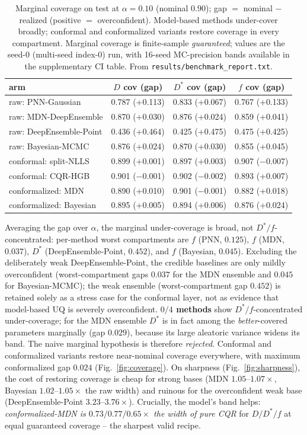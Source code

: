\documentclass[11pt]{article}
\newcommand{\Dstar}{D^{*}}
\begin{document}
\begin{table}[t]
\centering
\caption{Marginal coverage on test at $\alpha=0.10$ (nominal $0.90$); gap $=$
nominal $-$ realized (positive $=$ overconfident). Model-based methods under-cover
broadly; conformal and conformalized variants restore coverage in every
compartment. Marginal coverage is finite-sample \emph{guaranteed}; values are the
seed-0 (multi-seed index-0) run, with 16-seed MC-precision bands available in the
supplementary CI table. From \texttt{results/benchmark\_report.txt}.}
\label{tab:marginal}
\small
\begin{tabular}{lccc}
\toprule
arm & $D$ cov (gap) & $\Dstar$ cov (gap) & $f$ cov (gap) \\
\midrule
raw: PNN-Gaussian        & 0.787 (+0.113) & 0.833 (+0.067) & 0.767 (+0.133) \\
raw: MDN-DeepEnsemble    & 0.870 (+0.030) & 0.876 (+0.024) & 0.859 (+0.041) \\
raw: DeepEnsemble-Point  & 0.436 (+0.464) & 0.425 (+0.475) & 0.475 (+0.425) \\
raw: Bayesian-MCMC       & 0.876 (+0.024) & 0.870 (+0.030) & 0.855 (+0.045) \\
\midrule
conformal: split-NLLS    & 0.899 (+0.001) & 0.897 (+0.003) & 0.907 ($-$0.007) \\
conformal: CQR-HGB       & 0.901 ($-$0.001) & 0.902 ($-$0.002) & 0.893 (+0.007) \\
conformalized: MDN       & 0.890 (+0.010) & 0.901 ($-$0.001) & 0.882 (+0.018) \\
conformalized: Bayesian  & 0.895 (+0.005) & 0.894 (+0.006) & 0.876 (+0.024) \\
\bottomrule
\end{tabular}
\end{table}

Averaging the gap over $\alpha$, the marginal under-coverage is broad, not
$\Dstar/f$-concentrated: per-method worst compartments are $f$ (PNN, $0.125$), $f$
(MDN, $0.037$), $\Dstar$ (DeepEnsemble-Point, $0.452$), and $f$ (Bayesian, $0.045$).
Excluding the deliberately weak DeepEnsemble-Point, the credible baselines are only
mildly overconfident (worst-compartment gaps $0.037$ for the MDN ensemble and
$0.045$ for Bayesian-MCMC); the weak ensemble (worst-compartment gap $0.452$) is
retained solely as a stress case for the conformal layer, not as evidence that
model-based UQ is severely overconfident.
\textbf{$0/4$ methods} show $\Dstar/f$-concentrated under-coverage; for the MDN
ensemble $\Dstar$ is in fact among the \emph{better}-covered parameters
marginally (gap $0.029$), because its large aleatoric variance widens its band. The naive
marginal hypothesis is therefore \emph{rejected}. Conformal and conformalized
variants restore near-nominal coverage everywhere, with maximum conformalized gap
$0.024$ (Fig.~\ref{fig:coverage}). On sharpness (Fig.~\ref{fig:sharpness}), the
cost of restoring coverage is cheap for strong bases (MDN $1.05$--$1.07\times$,
Bayesian $1.02$--$1.05\times$ the raw width) and ruinous for the overconfident
weak base (DeepEnsemble-Point $3.23$--$3.76\times$). Crucially, the model's band
helps: \emph{conformalized-MDN is $0.73/0.77/0.65\times$ the width of pure CQR} for
$D/\Dstar/f$ at equal guaranteed coverage -- the sharpest valid recipe.
\end{document}
